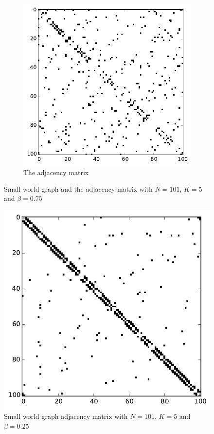 \begin{figure}[h]
\begin{subfigure}[b]{0.4\textwidth}
                \includegraphics[width=\textwidth]{images/topology/small_world_watts_adjacency_75.pdf}
                \caption{The adjacency matrix}
                \label{subfig:small world adjacency}
        \end{subfigure}
        \caption{Small world graph and the adjacency matrix with $N=101$, $K=5$ and $\beta =0.75$}
        \label{fig:small world adjacency graph}
\end{figure}

\begin{figure}[h]
\centering
\includegraphics[scale=0.7]{images/topology/small_world_watts_adjacency_25.pdf}
\caption{Small world graph adjacency matrix with $N=101$, $K=5$ and $\beta = 0.25$}
\label{fig:small world 25}
\end{figure}

